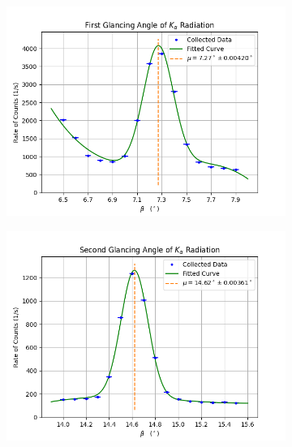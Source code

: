 \documentclass[twocolumn]{article}
\begin{document}
			\begin{figure}[h!]
				\begin{subfigure}{.33\textwidth}
					\begin{center}
						\includegraphics[width = \textwidth]{../Graphs/Peak 2}
					\end{center}
					\label{alpha 1}
				\end{subfigure}
				\begin{subfigure}{.33\textwidth}
					\begin{center}
						\includegraphics[width = \textwidth]{../Graphs/Peak 4}
					\end{center}
					\label{alpha 2}
				\end{subfigure}

\end{figure}
\end{document}
